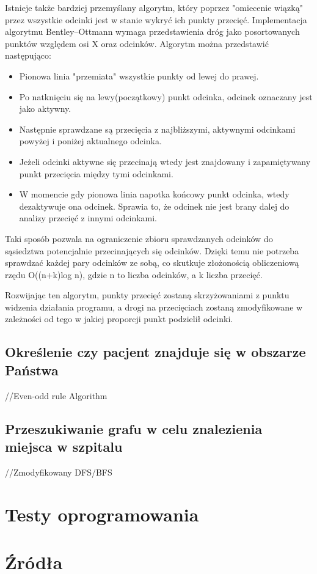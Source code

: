 \documentclass[10pt,a4paper]{article}
\begin{document}
Istnieje także bardziej przemyślany algorytm, który poprzez "omiecenie wiązką" przez wszystkie odcinki jest w stanie wykryć ich punkty przecięć.
Implementacja algorytmu Bentley–Ottmann wymaga przedstawienia dróg jako posortowanych punktów względem osi X oraz odcinków. Algorytm można przedstawić następująco:
\begin{itemize}
    \item Pionowa linia "przemiata" wszystkie punkty od lewej do prawej.
    \item Po natknięciu się na lewy(początkowy) punkt odcinka, odcinek oznaczany jest jako aktywny.
    \item Następnie sprawdzane są przecięcia z najbliższymi, aktywnymi odcinkami powyżej i poniżej aktualnego odcinka.
    \item Jeżeli odcinki aktywne się przecinają wtedy jest znajdowany i zapamiętywany punkt przecięcia między tymi odcinkami.
    \item W momencie gdy pionowa linia napotka końcowy punkt odcinka, wtedy dezaktywuje ona odcinek. Sprawia to, że odcinek nie jest brany dalej do analizy przecięć z innymi odcinkami.
\end{itemize}
Taki sposób pozwala na ograniczenie zbioru sprawdzanych odcinków do sąsiedztwa potencjalnie przecinających się odcinków.
Dzięki temu nie potrzeba sprawdzać każdej pary odcinków ze sobą, co skutkuje złożonością obliczeniową rzędu O((n+k)log n), gdzie n to liczba odcinków, a k liczba przecięć.

Rozwijając ten algorytm, punkty przecięć zostaną skrzyżowaniami z punktu widzenia działania programu, a drogi na przecięciach zostaną zmodyfikowane w zależności od tego w jakiej proporcji punkt podzielił odcinki.


\subsection{Określenie czy pacjent znajduje się w obszarze Państwa}

//Even-odd rule Algorithm

\subsection{Przeszukiwanie grafu w celu znalezienia miejsca w szpitalu}

//Zmodyfikowany DFS/BFS

\section{Testy oprogramowania}


\section{Źródła}
\end{document}
